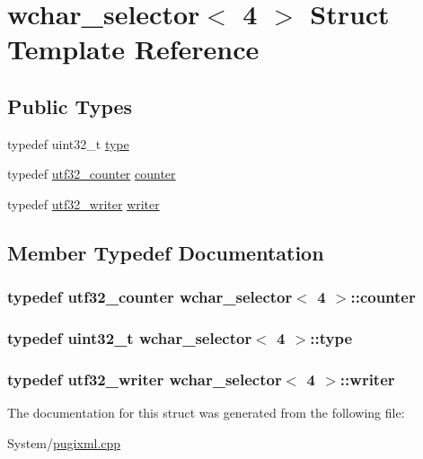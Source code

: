 \hypertarget{structwchar__selector_3_014_01_4}{\section{wchar\-\_\-selector$<$ 4 $>$ Struct Template Reference}
\label{structwchar__selector_3_014_01_4}
}
\subsection*{Public Types}
\begin{DoxyCompactItemize}
\item 
typedef uint32\-\_\-t \hyperlink{structwchar__selector_3_014_01_4_af45ac603ab6fefec66e5c29044b4eed6}{type}
\item 
typedef \hyperlink{structutf32__counter}{utf32\-\_\-counter} \hyperlink{structwchar__selector_3_014_01_4_a7d7c585ae0819660112b8c8683971b97}{counter}
\item 
typedef \hyperlink{structutf32__writer}{utf32\-\_\-writer} \hyperlink{structwchar__selector_3_014_01_4_a48042e7fe51c4661397ae7afe3905243}{writer}
\end{DoxyCompactItemize}


\subsection{Member Typedef Documentation}
\hypertarget{structwchar__selector_3_014_01_4_a7d7c585ae0819660112b8c8683971b97}{
\subsubsection[{counter}]{\setlength{\rightskip}{0pt plus 5cm}typedef {\bf utf32\-\_\-counter} {\bf wchar\-\_\-selector}$<$ 4 $>$\-::{\bf counter}}}\label{structwchar__selector_3_014_01_4_a7d7c585ae0819660112b8c8683971b97}
\hypertarget{structwchar__selector_3_014_01_4_af45ac603ab6fefec66e5c29044b4eed6}{
\subsubsection[{type}]{\setlength{\rightskip}{0pt plus 5cm}typedef uint32\-\_\-t {\bf wchar\-\_\-selector}$<$ 4 $>$\-::{\bf type}}}\label{structwchar__selector_3_014_01_4_af45ac603ab6fefec66e5c29044b4eed6}
\hypertarget{structwchar__selector_3_014_01_4_a48042e7fe51c4661397ae7afe3905243}{
\subsubsection[{writer}]{\setlength{\rightskip}{0pt plus 5cm}typedef {\bf utf32\-\_\-writer} {\bf wchar\-\_\-selector}$<$ 4 $>$\-::{\bf writer}}}\label{structwchar__selector_3_014_01_4_a48042e7fe51c4661397ae7afe3905243}


The documentation for this struct was generated from the following file\-:\begin{DoxyCompactItemize}
\item 
System/\hyperlink{pugixml_8cpp}{pugixml.\-cpp}\end{DoxyCompactItemize}
